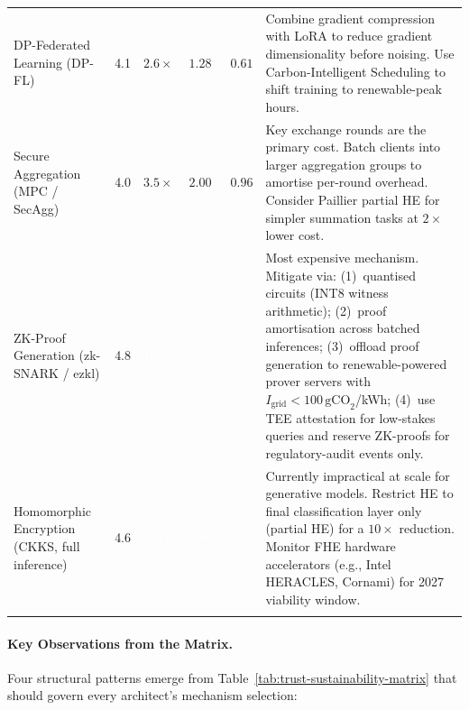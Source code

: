 \begin{table}[ht]
\begin{tabular}{p{2.5cm}C{1.2cm}C{1.2cm}C{1.5cm}C{1.5cm}p{3.6cm}}
DP-Federated Learning (DP-FL)
  & 4.1
  &   $2.6\times$
  &   $1.28$
  &  $0.61$
  & Combine gradient compression with LoRA
    \cite{hu2021} to reduce gradient
    dimensionality before noising. Use Carbon-Intelligent
    Scheduling to shift training to renewable-peak hours. \\[4pt]

Secure Aggregation (MPC / SecAgg)
  & 4.0
  &  $3.5\times$
  &  $2.00$
  &  $0.96$
  & Key exchange rounds are the primary cost. Batch clients
    into larger aggregation groups to amortise per-round
    overhead. Consider Paillier partial HE for simpler
    summation tasks at $2\times$ lower cost. \\[4pt]

ZK-Proof Generation (zk-SNARK / ezkl)
  & 4.8
  & \textcolor{white}{$18\times$}
  & \textcolor{white}{$13.6$}
  & \textcolor{white}{$6.53$}
  & Most expensive mechanism. Mitigate via:
    (1)~quantised circuits (INT8 witness arithmetic);
    (2)~proof amortisation across batched inferences;
    (3)~offload proof generation to renewable-powered
    prover servers with $I_{\mathrm{grid}} < 100\,
    \text{gCO}_2$/kWh;
    (4)~use TEE attestation for low-stakes queries and
    reserve ZK-proofs for regulatory-audit events only. \\[4pt]

Homomorphic Encryption (CKKS, full inference)
  & 4.6
  & \textcolor{white}{$250\times$}
  & \textcolor{white}{$199.2$}
  & \textcolor{white}{$95.6$}
  & Currently impractical at scale for generative models.
    Restrict HE to final classification layer only
    (partial HE) for a $10\times$ reduction. Monitor
    FHE hardware accelerators (e.g., Intel HERACLES,
    Cornami) for 2027 viability window. \\

\noalign{\smallskip}\hline\noalign{\smallskip}
\end{tabular}
\end{table}

\paragraph{Key Observations from the Matrix.}
Four structural patterns emerge from
Table~\ref{tab:trust-sustainability-matrix} that should govern
every architect's mechanism selection:

